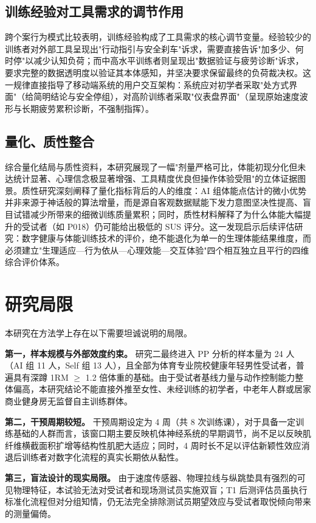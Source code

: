 \documentclass[UTF8,zihao=-4,twoside,openany]{ctexbook}
\begin{document}
\subsection{训练经验对工具需求的调节作用}
跨个案行为模式比较表明，训练经验构成了工具需求的核心调节变量。经验较少的训练者对外部工具呈现出"行动指引与安全刹车"诉求，需要直接告诉"加多少、何时停"以减少认知负荷；而中高水平训练者则呈现出"数据验证与疲劳诊断"诉求，要求完整的数据透明度以验证其本体感知，并坚决要求保留最终的负荷裁决权。这一规律直接指导了移动端系统的用户交互架构：系统应对初学者采取"处方式界面"（给简明结论与安全停组），对高阶训练者采取"仪表盘界面"（呈现原始速度波形与长期疲劳累积诊断，不强制指挥）。

\subsection{量化、质性整合}
综合量化结局与质性资料，本研究展现了一幅"剂量严格可比，体能初现分化但未达统计显著、心理信念极显著增强、工具精度优良但操作体验受阻"的立体证据图景。质性研究深刻阐释了量化指标背后的人的维度：AI 组体能点估计的微小优势并非来源于神话般的算法增量，而是源自客观数据赋能下发力意图坚决性提高、盲目试错减少所带来的细微训练质量累积；同时，质性材料解释了为什么体能大幅提升的受试者（如 P018）仍可能给出极低的 SUS 评分。这一发现启示后续评估研究：数字健康与体能训练技术的评价，绝不能退化为单一的生理体能结果维度，而必须建立"生理适应—行为依从—心理效能—交互体验"四个相互独立且平行的四维综合评价体系。

\section{研究局限}
本研究在方法学上存在以下需要坦诚说明的局限。

\textbf{第一，样本规模与外部效度约束。} 研究二最终进入 PP 分析的样本量为 24 人（AI 组 11 人，Self 组 13 人），且全部为体育专业院校健康年轻男性受试者，普遍具有深蹲 1RM $\ge$ 1.2 倍体重的基础。由于受试者基线力量与动作控制能力整体偏高，本研究结论不能直接外推至女性、未经训练的初学者，中老年人群或居家商业健身房无监督自主训练群体。

\textbf{第二，干预周期较短。} 干预周期设定为 4 周（共 8 次训练课），对于具备一定训练基础的人群而言，该窗口期主要反映机体神经系统的早期调节，尚不足以反映肌纤维横截面积扩增等结构性肌肥大适应；同时，4 周时长不足以评估新颖性效应消退后训练者对数字化流程的真实长期依从黏性。

\textbf{第三，盲法设计的现实局限。} 由于速度传感器、物理拉线与纵跳垫具有强烈的可见物理特征，本试验无法对受试者和现场测试员实施双盲；T1 后测评估员虽执行标准化流程但对分组知情，仍无法完全排除测试员期望效应与受试者取悦倾向带来的测量偏倚。
\end{document}
